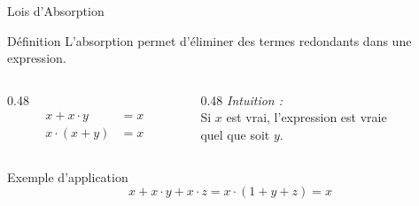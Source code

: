 \begin{frame}{Lois d'Absorption}

    \begin{block}{Définition}
        L'absorption permet d'éliminer des termes redondants dans une expression.
    \end{block}

    \vspace{0.5cm}

    \begin{columns}[T]
        \begin{column}{0.48\textwidth}
            \begin{align*}
                x + x \cdot y &= x \\
                x \cdot (x + y) &= x
            \end{align*}
        \end{column}
        \begin{column}{0.48\textwidth}
            \centering
            \textit{Intuition :}\\
            \vspace{0.2cm}
            Si \(x\) est vrai, l'expression est vraie\\
            quel que soit \(y\).
        \end{column}
    \end{columns}

    \vspace{0.5cm}

    \begin{exampleblock}{Exemple d'application}
        \[
            x + x \cdot y + x \cdot z = x \cdot (1 + y + z) = x
        \]
    \end{exampleblock}

\end{frame}

